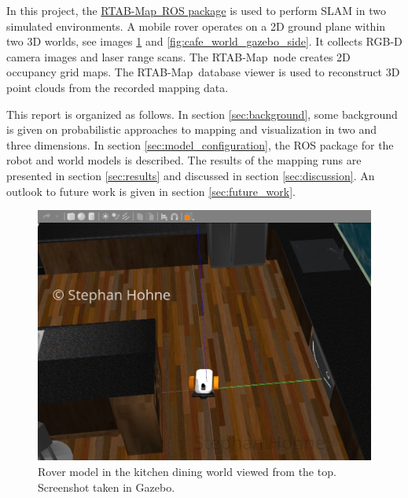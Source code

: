 \documentclass[10pt, journal, compsoc]{IEEEtran}
\newcommand{\rtab}{RTAB-Map}
\begin{document}
In this project, the \href{http://wiki.ros.org/rtabmap_ros}{\rtab\ ROS package} is used to perform SLAM in two simulated environments. A mobile rover operates on a 2D ground plane within two 3D worlds, see images \ref{fig:rover_top} and \ref{fig:cafe_world_gazebo_side}. It collects RGB-D camera images and laser range scans. The \rtab\ node creates 2D occupancy grid maps. The \rtab\ database viewer is used to reconstruct 3D point clouds from the recorded mapping data.

This report is organized as follows. In section \ref{sec:background}, some background is given on probabilistic approaches to mapping and visualization in two and three dimensions. In section \ref{sec:model_configuration}, the ROS package for the robot and world models is described. The results of the mapping runs are presented in section \ref{sec:results} and discussed in section \ref{sec:discussion}. An outlook to future work is given in section \ref{sec:future_work}. 

\begin{figure}[thpb]
      \centering
      \includegraphics[width=\columnwidth]{images/kitchen_dining_rover_top.jpg}
      \caption{Rover model in the kitchen dining world viewed from the top. Screenshot taken in Gazebo.}
      \label{fig:rover_top}
\end{figure}
\end{document}
